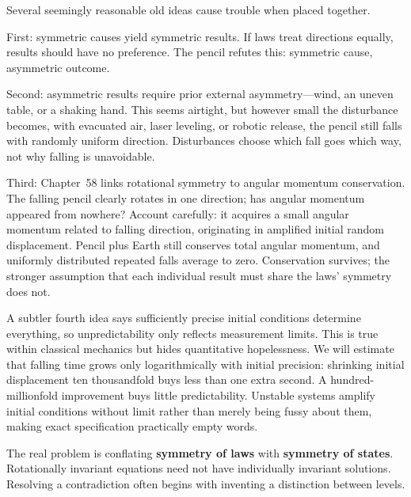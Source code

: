
\begin{mainline}
Several seemingly reasonable old ideas cause trouble when placed together.

First: symmetric causes yield symmetric results. If laws treat directions equally, results should have no preference. The pencil refutes this: symmetric cause, asymmetric outcome.

Second: asymmetric results require prior external asymmetry---wind, an uneven table, or a shaking hand. This seems airtight, but however small the disturbance becomes, with evacuated air, laser leveling, or robotic release, the pencil still falls with randomly uniform direction. Disturbances choose which fall goes which way, not why falling is unavoidable.

Third: Chapter~58 links rotational symmetry to angular momentum conservation. The falling pencil clearly rotates in one direction; has angular momentum appeared from nowhere? Account carefully: it acquires a small angular momentum related to falling direction, originating in amplified initial random displacement. Pencil plus Earth still conserves total angular momentum, and uniformly distributed repeated falls average to zero. Conservation survives; the stronger assumption that each individual result must share the laws' symmetry does not.

A subtler fourth idea says sufficiently precise initial conditions determine everything, so unpredictability only reflects measurement limits. This is true within classical mechanics but hides quantitative hopelessness. We will estimate that falling time grows only logarithmically with initial precision: shrinking initial displacement ten thousandfold buys less than one extra second. A hundred-millionfold improvement buys little predictability. Unstable systems amplify initial conditions without limit rather than merely being fussy about them, making exact specification practically empty words.

The real problem is conflating \textbf{symmetry of laws} with \textbf{symmetry of states}. Rotationally invariant equations need not have individually invariant solutions. Resolving a contradiction often begins with inventing a distinction between levels.
\end{mainline}


